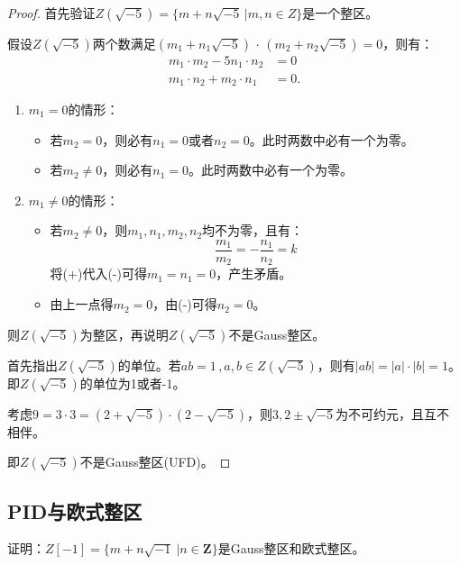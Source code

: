 \begin{proof}
	首先验证$Z(\sqrt{-5})=\{m+n\sqrt{-5}\, \Big| m,n\in Z\}$是一个整区。\par
	假设$Z(\sqrt{-5})$两个数满足$(m_{1}+n_{1}\sqrt{-5})\, \cdot \, (m_{2}+n_{2}\sqrt{-5})=0$，则有：
\begin{equation*}
	\begin{aligned}
			m_{1}\cdot m_{2}-5n_{1} \cdot n_{2}&=0\\
			m_{1}\cdot n_{2}+m_{2}\cdot n_{1}&=0.
	\end{aligned}\tag{-}
\end{equation*}
	\begin{enumerate}
		\item $m_{1}=0$的情形：
		\begin{itemize}
			\item 若$m_{2}=0$，则必有$n_{1}=0$或者$n_{2}=0$。此时两数中必有一个为零。
			\item 若$m_{2}\neq 0$，则必有$n_{1}=0$。此时两数中必有一个为零。
		\end{itemize}
		\item $m_{1}\neq 0$的情形：
		\begin{itemize}
			\item 若$m_{2}\neq 0$，则$m_{1},n_{1},m_{2},n_{2}$均不为零，且有：
			\begin{equation*}
				\frac{m_{1}}{m_{2}}=-\frac{n_{1}}{n_{2}}=k\tag{+}
			\end{equation*}
			将(+)代入(-)可得$m_{1}=n_{1}=0$，产生矛盾。
			\item 由上一点得$m_{2}=0$，由(-)可得$n_{2}=0$。
			
		\end{itemize}
	\end{enumerate}
	则$Z(\sqrt{-5})$为整区，再说明$Z(\sqrt{-5})$不是Gauss整区。\par
	首先指出$Z(\sqrt{-5})$的单位。若$ab=1\, , a,b\in Z(\sqrt{-5})$，则有$|ab|=|a|\cdot|b|=1$。即$Z(\sqrt{-5})$的单位为1或者-1。\par
	考虑$9=3\cdot 3=(2+\sqrt{-5})\cdot(2-\sqrt{-5})$，则$3,2\pm \sqrt{-5}$为不可约元，且互不相伴。\par
	即$Z(\sqrt{-5})$不是Gauss整区(UFD)。
\end{proof}

\subsection{PID与欧式整区}

\begin{example}
	证明：$Z[-1]=\{m+n\sqrt{-1}\ \big| n\in \mathbf{Z}\}$是Gauss整区和欧式整区。
\end{example}

